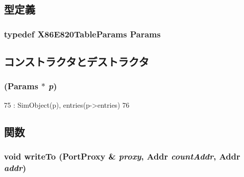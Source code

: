\subsection{型定義}
\hypertarget{classX86ISA_1_1E820Table_a84755d6f6a8627e71c15d80a4aa7c1a7}{
\subsubsection[{Params}]{\setlength{\rightskip}{0pt plus 5cm}typedef X86E820TableParams {\bf Params}}}
\label{classX86ISA_1_1E820Table_a84755d6f6a8627e71c15d80a4aa7c1a7}


\subsection{コンストラクタとデストラクタ}
\hypertarget{classX86ISA_1_1E820Table_a235e45a6f37dbc3e1ac9c29a592a9f12}{
\subsubsection[{E820Table}]{ ({\bf Params} $\ast$ {\em p})}}
\label{classX86ISA_1_1E820Table_a235e45a6f37dbc3e1ac9c29a592a9f12}



\begin{DoxyCode}
75                              : SimObject(p), entries(p->entries)
76         {}
\end{DoxyCode}


\subsection{関数}
\hypertarget{classX86ISA_1_1E820Table_a09670d948d4e9a8eb98e40b68b24b7b1}{
\subsubsection[{writeTo}]{\setlength{\rightskip}{0pt plus 5cm}void writeTo ({\bf PortProxy} \& {\em proxy}, \/  {\bf Addr} {\em countAddr}, \/  {\bf Addr} {\em addr})}}
\label{classX86ISA_1_1E820Table_a09670d948d4e9a8eb98e40b68b24b7b1}



